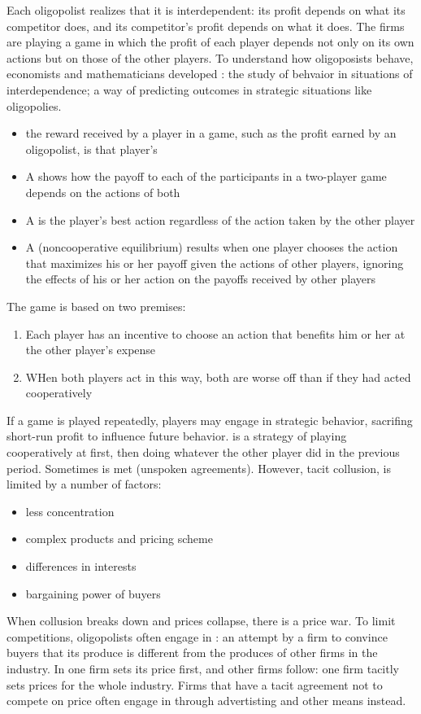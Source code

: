 \documentclass{article}
\begin{document}
Each oligopolist realizes that it is interdependent: its profit depends on what its competitor does, and its competitor's profit depends on what it does. The firms are playing a game in which the profit of each player depends not only on its own actions but on those of the other players. To understand how oligoposists behave, economists and mathematicians developed : the study of behvaior in situations of interdependence; a way of predicting outcomes in strategic situations like oligopolies. 
\begin{itemize}
  \item the reward received by a player in a game, such as the profit earned by an oligopolist, is that player's 
  \item A  shows how the payoff to each of the participants in a two-player game depends on the actions of both
  \item A  is the player's best action regardless of the action taken by the other player 
  \item A  (noncooperative equilibrium) results when one player chooses the action that maximizes his or her payoff given the actions of other players, ignoring the effects of his or her action on the payoffs received by other players
\end{itemize}

The game is based on two premises:
\begin{enumerate}
  \item Each player has an incentive to choose an action that benefits him or her at the other player's expense 
  \item WHen both players act in this way, both are worse off than if they had acted cooperatively
\end{enumerate}

If a game is played repeatedly, players may engage in strategic behavior, sacrifing short-run profit to influence future behavior.  is a strategy of playing cooperatively at first, then doing whatever the other player did in the previous period. Sometimes  is met (unspoken agreements). However, tacit collusion, is limited by a number of factors:
\begin{itemize}
  \item less concentration
  \item complex products and pricing scheme
  \item differences in interests 
  \item bargaining power of buyers
\end{itemize}

When collusion breaks down and prices collapse, there is a price war. To limit competitions, oligopolists often engage in : an attempt by a firm to convince buyers that its produce is different from the produces of other firms in the industry. In  one firm sets its price first, and other firms follow: one firm tacitly sets prices for the whole industry. Firms that have a tacit agreement not to compete on price often engage in  through advertisting and other means instead. 
\end{document}
